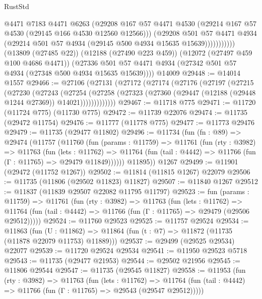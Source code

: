 \begin{lexlean}{RustStd}
\begin{coremodule}
                      @4471
                      @7183
                      @4471
                      @6263
                      (@29208
                        @167
                        @57
                        @4471
                        @4530
                        (@29214 @167 @57 @4530 (@29145 @166 @4530 @12560 @12566)))
                      (@29208
                        @501
                        @57
                        @4471
                        @4934
                        (@29214 @501 @57 @4934 (@29145 @500 @4934 @15635 @15639)))))))))))
      (@13809 (@27485 @22))
      (@12188 (@27490 @223 @459))
      (@12072 (@27497 @459 @100 @4686 @4471))
      (@27336 @501 @57 @4471 @4934 (@27342 @501 @57 @4934 (@27348 @500 @4934 @15635 @15639))))
    @14009
@29448 := @14014 @1557
@29466 := @27106
    (@27131
      (@27172
        (@27174
          (@27176
            (@27197
              (@27215
                (@27230
                  (@27243
                    (@27254
                      (@27258
                        (@27323 (@27360 (@29447 (@12188 (@29448 @1244 @27369)) @14021)))))))))))))
@29467 := @11718 @775
@29471 := @11720 (@11724 @775) (@11730 @775)
@29472 := @11739 @22076
@29474 := @11735 (@29472 @11754)
@29476 := @11777 (@11778 @775)
@29477 := @11773 @29476
@29479 := @11735 (@29477 @11802)
@29496 := @11734
    (fun (fn : @89) =>
    @29474
      (@11757
        (@11760
          (fun (params : @11759) =>
          @11761
            (fun (rty : @3982) =>
            @11763
              (fun (lets : @11762) =>
              @11764 (fun (tail : @4442) => @11766 (fun (Γ : @11765) => @29479 @11849))))))
        @11895))
    @1267
@29499 := @11901 (@29472 (@11752 @1267))
@29502 := @11814 (@11815 @1267) @22079
@29506 := @11735 (@11806 (@29502 @11823) @11827)
@29507 := @11840 @1267
@29512 := @11837 (@11839 @29507 @22082 @11795 @11797)
@29523 := fun (params : @11759) =>
  @11761
    (fun (rty : @3982) =>
    @11763
      (fun (lets : @11762) =>
      @11764 (fun (tail : @4442) => @11766 (fun (Γ : @11765) => @29479 (@29506 @29512)))))
@29524 := @11760 @29523
@29525 := @11757 @29524
@29534 := @11863
    (fun (U : @11862) => @11864 (fun (t : @7) => @11872 (@11735 (@11878 @22079 @11753) @11889)))
@29537 := @29499 (@29525 @29534) @22077
@29539 := @11720 @29524 @29534
@29541 := @11950 @29523 @5718
@29543 := @11735 (@29477 @21953)
@29544 := @29502 @21956
@29545 := @11806 @29544
@29547 := @11735 (@29545 @11827)
@29558 := @11953
    (fun (rty : @3982) =>
    @11763
      (fun (lets : @11762) =>
      @11764 (fun (tail : @4442) => @11766 (fun (Γ : @11765) => @29543 (@29547 @29512)))))

\end{coremodule}
\end{lexlean}
